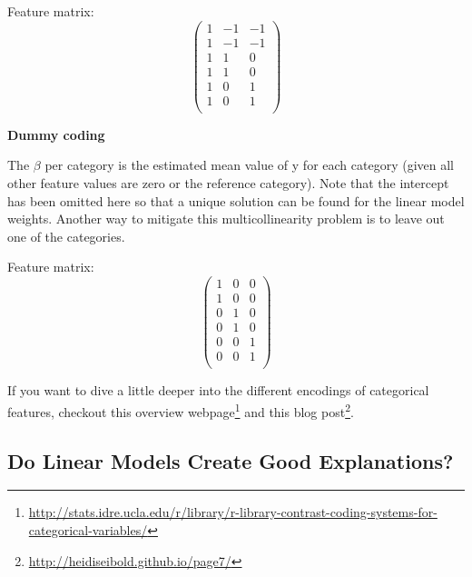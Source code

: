 \documentclass[
  12pt,
]{krantz}
\renewcommand{\href}[2]{#2\footnote{\url{#1}}}
\begin{document}
Feature matrix: \[\begin{pmatrix}1&-1&-1\\1&-1&-1\\1&1&0\\1&1&0\\1&0&1\\1&0&1\\\end{pmatrix}\]

\textbf{Dummy coding}

The \(\beta\) per category is the estimated mean value of y for each category (given all other feature values are zero or the reference category).
Note that the intercept has been omitted here so that a unique solution can be found for the linear model weights.
Another way to mitigate this multicollinearity problem is to leave out one of the categories.

Feature matrix: \[\begin{pmatrix}1&0&0\\1&0&0\\0&1&0\\0&1&0\\0&0&1\\0&0&1\\\end{pmatrix}\]

If you want to dive a little deeper into the different encodings of categorical features, checkout \href{http://stats.idre.ucla.edu/r/library/r-library-contrast-coding-systems-for-categorical-variables/}{this overview webpage} and
\href{http://heidiseibold.github.io/page7/}{this blog post}.

\hypertarget{do-linear-models-create-good-explanations}{%
\subsection{Do Linear Models Create Good Explanations?}\label{do-linear-models-create-good-explanations}}
\end{document}
